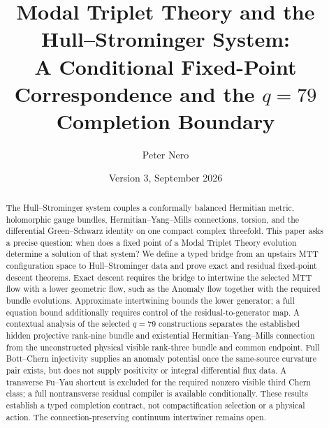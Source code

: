 \documentclass[11pt]{article}
\title{\vspace{-1em}
Modal Triplet Theory and the Hull--Strominger System:\\[0.25em]
\large A Conditional Fixed-Point Correspondence and the \(q=79\)
Completion Boundary}
\author{Peter Nero}
\date{Version 3, September 2026}
\theoremstyle{definition}
\theoremstyle{remark}
\begin{document}
\maketitle

\begin{abstract}
The Hull--Strominger system couples a conformally balanced Hermitian metric,
holomorphic gauge bundles, Hermitian--Yang--Mills connections, torsion, and the
differential Green--Schwarz identity on one compact complex threefold.  This
paper asks a precise question: when does a fixed point of a Modal Triplet
Theory evolution determine a solution of that system?  We define a typed
bridge from an upstairs MTT configuration space to Hull--Strominger data and
prove exact and residual fixed-point descent theorems.  Exact descent requires
the bridge to intertwine the selected MTT flow with a lower geometric flow,
such as the Anomaly flow together with the required bundle evolutions.
Approximate intertwining bounds the lower generator; a full equation bound
additionally requires control of the residual-to-generator map.  A contextual
analysis of the selected \(q=79\) constructions separates the established
hidden projective rank-nine bundle and existential Hermitian--Yang--Mills
connection from the unconstructed physical visible rank-three bundle and
common endpoint.  Full Bott--Chern injectivity supplies an anomaly potential
once the same-source curvature pair exists, but does not supply positivity
or integral differential flux data.  A transverse Fu--Yau shortcut is excluded
for the required nonzero visible third Chern class; a full nontransverse
residual compiler is available conditionally.  These results establish a
typed completion contract, not compactification selection or a physical
action.  The connection-preserving continuum intertwiner remains open.
\end{abstract}
\end{document}
